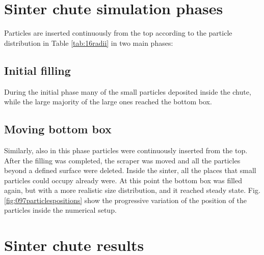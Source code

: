 




\section{Sinter chute simulation phases}
\label{sec:sinterchutesimulationphases}


Particles are inserted continuously from the top according to the particle
distribution in Table \ref{tab:16radii} in two main phases:

\subsection{Initial filling}
\label{subsec:initialfilling}

During the initial phase many of the small particles deposited inside the chute,
while the large majority of the large ones reached the bottom box.

\subsection{Moving bottom box}
\label{subsec:movingbottombox}

Similarly, also in this phase particles were
continuously inserted from the top. After the filling was completed, the
scraper was moved and all the particles beyond a defined surface were
deleted. Inside the sinter, all the places that small particles could
occupy already were. At this point the bottom box was filled again, but
with a more realistic size distribution, and it reached steady state.
Fig. \ref{fig:097particlespositions} show the progressive variation of the
position of the particles inside the numerical setup.

\section{Sinter chute results}
\label{sec:sinterchuteresults}

